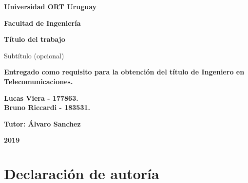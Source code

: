 \documentclass[12pt,a4paper,oneside]{book}
\begin{document}
\vspace*{\fill}

\begin{center}

\begin{Large}
\textbf{Universidad ORT Uruguay}

\textbf{Facultad de Ingeniería}
\vspace{5cm}
\end{Large}

\begin{huge}
\textbf{Título del trabajo}
\end{huge} 

\begin{Large}
Subtítulo (opcional)
\end{Large}
\bigskip
\bigskip


\textbf{Entregado como requisito para la obtención del título de Ingeniero en Telecomunicaciones.}
\vspace{5cm}

\begin{Large}
\textbf{Lucas Viera - 177863.}\\
\textbf{Bruno Riccardi - 183531.}\\
\bigskip

\textbf{Tutor: Álvaro Sanchez}
\vspace{2cm}
\end{Large}

\begin{huge}
\textbf{2019}
\end{huge}

\end{center}
\vspace*{\fill}

\thispagestyle{empty}
\newpage




\chapter*{Declaración de autoría}
\end{document}
